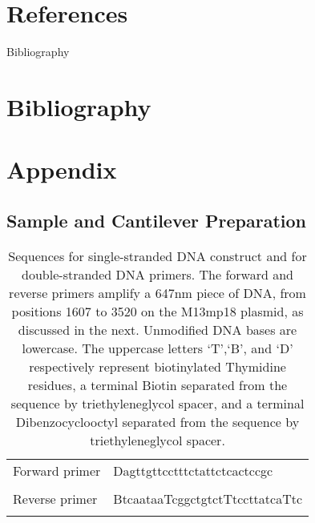 \documentclass[%
  aip,12pt,tightenlines,
  amsthm,
 amsmath,amssymb
]{article}
\newcommand{\e}[0]{\\ \hline}
\newcommand{\tLabel}[1]{\label{table:#1}}
\newcommand{\sLabel}[1]{\label{section:#1}}
\newcommand{\firstp}[0]{}
\newcommand{\pl}[0]{\vspace{6pt}}
\begin{document}
\firstp \pl

\clearpage

\section{References}



\clearpage

Bibliography 

\section{Bibliography}

 


\clearpage

\section{Appendix}

\renewcommand{\thepage}{S\arabic{page}} 
\renewcommand{\thesection}{S\arabic{section}}  
\renewcommand{\thetable}{S\arabic{table}}  
\renewcommand{\thefigure}{S\arabic{figure}} 
\setcounter{figure}{0}
\setcounter{table}{0}


\subsection{\sLabel{SampleDetails}Sample and Cantilever Preparation}


\begin{table}
\begin{tabularx}{\textwidth}{ l | l  }
\hline \hline
Forward primer & Dagttgttcctttctattctcactccgc \\ \e 
Reverse primer & BtcaataaTcggctgtctTtccttatcaTtc \\ \e 
\end{tabularx}
\caption[DNA primer sequences]{\tLabel{Sequences}Sequences for single-stranded DNA construct and for double-stranded DNA primers. The forward and reverse primers amplify a 647nm piece of DNA, from positions 1607 to 3520 on the M13mp18 plasmid, as discussed in the next. Unmodified DNA bases are lowercase. The uppercase letters `T',`B', and `D' respectively represent biotinylated Thymidine residues, a terminal Biotin separated from the sequence by triethyleneglycol spacer, and a terminal Dibenzocyclooctyl separated from the sequence by triethyleneglycol spacer.}
\end{table}
\end{document}
